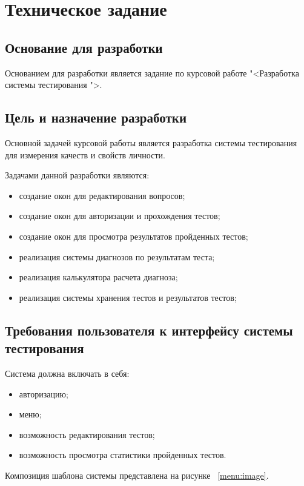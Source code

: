 \section{Техническое задание}
\subsection{Основание для разработки}

Основанием для разработки является задание по курсовой работе "<Разработка системы тестирования \textquotedbl">.

\subsection{Цель и назначение разработки}

Основной задачей курсовой работы является разработка системы тестирования для измерения качеств и свойств личности.

Задачами данной разработки являются:
\begin{itemize}
\item создание окон для редактирования вопросов;
\item создание окон для авторизации и прохождения тестов;
\item создание окон для просмотра результатов пройденных тестов;
\item реализация системы диагнозов по результатам теста;
\item реализация калькулятора расчета диагноза;
\item реализация системы хранения тестов и результатов тестов;
\end{itemize}

\subsection{Требования пользователя к интерфейсу системы тестирования}

Система должна включать в себя:
\begin{itemize}
    \item авторизацию;
    \item меню;
    \item возможность редактирования тестов;
    \item возможность просмотра статистики пройденных тестов.
\end{itemize}

Композиция шаблона системы представлена на рисунке ~\ref{menu:image}.

